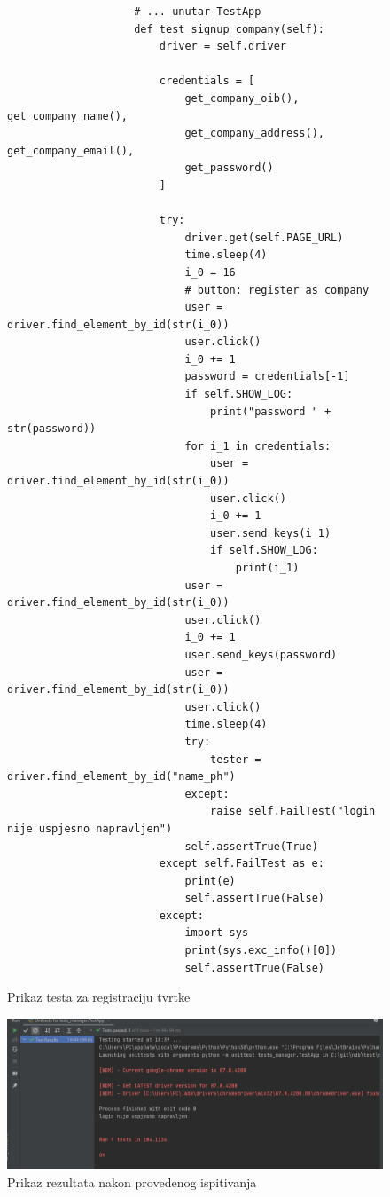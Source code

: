 						
			\begin{figure}[H]
								\begin{lstlisting}
					# ... unutar TestApp
	    			def test_signup_company(self):
						driver = self.driver
						
						credentials = [
							get_company_oib(), get_company_name(), 
							get_company_address(), get_company_email(), 
							get_password()
						]
						
						try:
							driver.get(self.PAGE_URL)
							time.sleep(4)							
							i_0 = 16							
							# button: register as company
							user = driver.find_element_by_id(str(i_0))
							user.click()
							i_0 += 1							
							password = credentials[-1]
							if self.SHOW_LOG:
								print("password " + str(password))							
							for i_1 in credentials:
								user = driver.find_element_by_id(str(i_0))
								user.click()
								i_0 += 1
								user.send_keys(i_1)
								if self.SHOW_LOG:
									print(i_1)							
							user = driver.find_element_by_id(str(i_0))
							user.click()
							i_0 += 1
							user.send_keys(password)							
							user = driver.find_element_by_id(str(i_0))
							user.click()							
							time.sleep(4)							
							try:
								tester = driver.find_element_by_id("name_ph")
							except:
								raise self.FailTest("login nije uspjesno napravljen")
							self.assertTrue(True)
						except self.FailTest as e:
							print(e)
							self.assertTrue(False)
						except:
							import sys
							print(sys.exc_info()[0])
							self.assertTrue(False)	
				\end{lstlisting}
	
				\centering
				\caption{Prikaz testa za registraciju tvrtke}
				\label{fig:test - sistemski - registracija tvrtke }
			\end{figure}		
			
			\begin{figure}[H]
				\includegraphics[scale=0.6]{slike/test_sistem_rezultat.png} %
				\centering
				\caption{Prikaz rezultata nakon provedenog ispitivanja}
				\label{fig:test - sistemski - rezultat}
			\end{figure}					
	
